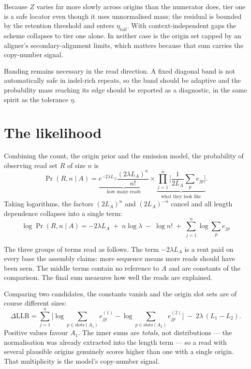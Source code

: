 \documentclass[11pt]{article}
\newcommand{\Prob}{\Pr}
\begin{document}
Because $Z$ varies far more slowly across origins than the numerator does,
tier one is a safe locator even though it uses unnormalised mass; the residual
is bounded by the retention threshold and enters $\eta_{\text{tail}}$.  With
context-independent gaps the scheme collapses to tier one alone.  In neither
case is the origin set capped by an aligner's secondary-alignment limits, which
matters because that sum carries the copy-number signal.

Banding remains necessary in the read direction.  A fixed diagonal band is not
automatically safe in indel-rich repeats, so the band should be adaptive and
the probability mass reaching its edge should be reported as a diagnostic,
in the same spirit as the tolerance $\eta$.

\section{The likelihood}
\label{sec:likelihood}

Combining the count, the origin prior and the emission model, the probability of
observing read set $R$ of size $n$ is
\begin{equation}
    \Prob(R,n \mid A)
    = \underbrace{e^{-2\lambda L_A}\frac{(2\lambda L_A)^n}{n!}}_{\text{how many reads}}
      \times
      \underbrace{\prod_{j=1}^{n}\Big[\frac{1}{2L_A}\sum_{p} e_{jp}\Big]}_{\text{what they look like}} .
\end{equation}
Taking logarithms, the factors $(2L_A)^n$ and $(2L_A)^{-n}$ cancel and all
length dependence collapses into a single term:
\begin{equation}
    \boxed{\;
    \log\Prob(R,n\mid A)
    = -2\lambda L_A \;+\; n\log\lambda \;-\; \log n!
      \;+\; \sum_{j=1}^{n}\log\sum_{p}e_{jp} \; }
\label{eq:loglik}
\end{equation}

The three groups of terms read as follows.  The term $-2\lambda L_A$ is a rent
paid on every base the assembly claims: more sequence means more reads should
have been seen.  The middle terms contain no reference to $A$ and are constants
of the comparison.  The final sum measures how well the reads are explained.

Comparing two candidates, the constants vanish and the origin slot sets are of
course different sizes:
\begin{equation}
    \Delta\mathrm{LLR}
    = \sum_{j=1}^{n}\Bigg[
        \log\!\!\sum_{p\in\mathrm{slots}(A_1)}\!\! e^{(1)}_{jp}
      - \log\!\!\sum_{p\in\mathrm{slots}(A_2)}\!\! e^{(2)}_{jp}
      \Bigg]
      \;-\; 2\lambda\,(L_1-L_2).
\label{eq:dllr}
\end{equation}
Positive values favour $A_1$.  The inner sums are \emph{totals}, not
distributions --- the normalisation was already extracted into the length term
--- so a read with several plausible origins genuinely scores higher than one
with a single origin.  That multiplicity is the model's copy-number signal.
\end{document}
